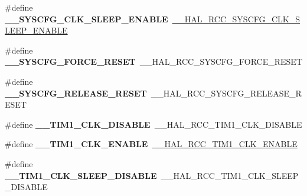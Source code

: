 \begin{DoxyCompactItemize}
\#define {\bfseries \+\_\+\+\_\+\+S\+Y\+S\+C\+F\+G\+\_\+\+C\+L\+K\+\_\+\+S\+L\+E\+E\+P\+\_\+\+E\+N\+A\+B\+LE}~\mbox{\hyperlink{group___r_c_c___peripheral___clock___sleep___enable___disable_ga6e3a8ca9e554e3aa7aba57d034725655}{\+\_\+\+\_\+\+H\+A\+L\+\_\+\+R\+C\+C\+\_\+\+S\+Y\+S\+C\+F\+G\+\_\+\+C\+L\+K\+\_\+\+S\+L\+E\+E\+P\+\_\+\+E\+N\+A\+B\+LE}}
\item 
\mbox{\label{group___h_a_l___r_c_c___aliased_ga4beacdd25611c64ffc04f6b7e6981e65}} 
\#define {\bfseries \+\_\+\+\_\+\+S\+Y\+S\+C\+F\+G\+\_\+\+F\+O\+R\+C\+E\+\_\+\+R\+E\+S\+ET}~\+\_\+\+\_\+\+H\+A\+L\+\_\+\+R\+C\+C\+\_\+\+S\+Y\+S\+C\+F\+G\+\_\+\+F\+O\+R\+C\+E\+\_\+\+R\+E\+S\+ET
\item 
\mbox{\label{group___h_a_l___r_c_c___aliased_ga9460d38c3a8c209620b68453a12c6c56}} 
\#define {\bfseries \+\_\+\+\_\+\+S\+Y\+S\+C\+F\+G\+\_\+\+R\+E\+L\+E\+A\+S\+E\+\_\+\+R\+E\+S\+ET}~\+\_\+\+\_\+\+H\+A\+L\+\_\+\+R\+C\+C\+\_\+\+S\+Y\+S\+C\+F\+G\+\_\+\+R\+E\+L\+E\+A\+S\+E\+\_\+\+R\+E\+S\+ET
\item 
\mbox{\label{group___h_a_l___r_c_c___aliased_gac374cff1e951672a19aa5857c58674f7}} 
\#define {\bfseries \+\_\+\+\_\+\+T\+I\+M1\+\_\+\+C\+L\+K\+\_\+\+D\+I\+S\+A\+B\+LE}~\+\_\+\+\_\+\+H\+A\+L\+\_\+\+R\+C\+C\+\_\+\+T\+I\+M1\+\_\+\+C\+L\+K\+\_\+\+D\+I\+S\+A\+B\+LE
\item 
\mbox{\label{group___h_a_l___r_c_c___aliased_gaca66d24989c6306dabafd38dd3b2a34f}} 
\#define {\bfseries \+\_\+\+\_\+\+T\+I\+M1\+\_\+\+C\+L\+K\+\_\+\+E\+N\+A\+B\+LE}~\mbox{\hyperlink{group___r_c_c_ex___peripheral___clock___enable___disable_gad693d7300ed7134b60bb1a645e762358}{\+\_\+\+\_\+\+H\+A\+L\+\_\+\+R\+C\+C\+\_\+\+T\+I\+M1\+\_\+\+C\+L\+K\+\_\+\+E\+N\+A\+B\+LE}}
\item 
\mbox{\label{group___h_a_l___r_c_c___aliased_ga4c6a5618073539cc5ae7f4662dfa96d9}} 
\#define {\bfseries \+\_\+\+\_\+\+T\+I\+M1\+\_\+\+C\+L\+K\+\_\+\+S\+L\+E\+E\+P\+\_\+\+D\+I\+S\+A\+B\+LE}~\+\_\+\+\_\+\+H\+A\+L\+\_\+\+R\+C\+C\+\_\+\+T\+I\+M1\+\_\+\+C\+L\+K\+\_\+\+S\+L\+E\+E\+P\+\_\+\+D\+I\+S\+A\+B\+LE
\item 
\mbox{\label{group___h_a_l___r_c_c___aliased_ga3ffdcca982a4a5d4b024e43cbcb5f1fe}} 

\end{DoxyCompactItemize}
